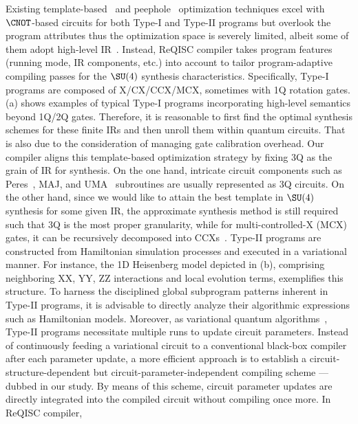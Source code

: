 

Existing template-based~\cite{maslov2008quantum,bravyi2021clifford} and peephole~\cite{prasad2006data,sivarajah2020t} optimization techniques excel with $\CNOT$-based circuits for both Type-I and Type-II programs but overlook the program attributes thus the optimization space is severely limited, albeit some of them adopt high-level IR~\cite{li2022paulihedral,van2023towards}. Instead, ReQISC compiler takes program features (running mode, IR components, etc.) into account to tailor program-adaptive compiling passes for the $\SU(4)$ synthesis characteristics. Specifically, Type-I programs are composed of $\mathrm{X}$/$\mathrm{CX}$/$\mathrm{CCX}$/$\mathrm{MCX}$, sometimes with 1Q rotation gates.  (a) shows examples of typical Type-I programs incorporating high-level semantics beyond 1Q/2Q gates. Therefore, it is reasonable to first find the optimal synthesis schemes for these finite IRs and then unroll them within quantum circuits. That is also due to the consideration of managing gate calibration overhead. Our compiler aligns this template-based optimization strategy by fixing 3Q as the grain of IR for synthesis. On the one hand, intricate circuit components such as Peres~\cite{thapliyal2009design}, MAJ, and UMA~\cite{cuccaro2004new} subroutines are usually represented as 3Q circuits. On the other hand, since we would like to attain the best template in $\SU(4)$ synthesis for some given IR, the approximate synthesis method is still required such that 3Q is the most proper granularity, while for multi-controlled-X ($\mathrm{MCX}$) gates, it can be recursively decomposed into $\mathrm{CCX}$s~\cite{barenco1995elementary}. Type-II programs are constructed from Hamiltonian simulation processes and executed in a variational manner. For instance, the 1D Heisenberg model depicted in  (b), comprising neighboring $\mathrm{XX}$, $\mathrm{YY}$, $\mathrm{ZZ}$ interactions and local evolution terms, exemplifies this structure. To harness the disciplined global subprogram patterns inherent in Type-II programs, it is advisable to directly analyze their algorithmic expressions such as Hamiltonian models. Moreover, as variational quantum algorithms~\cite{cerezo2021variational}, Type-II programs necessitate multiple runs to update circuit parameters. Instead of continuously feeding a variational circuit to a conventional black-box compiler after each parameter update, a more efficient approach is to establish a circuit-structure-dependent but circuit-parameter-independent compiling scheme --- dubbed  in our study. By means of this scheme, circuit parameter updates are directly integrated into the compiled circuit without compiling once more. In ReQISC compiler, 